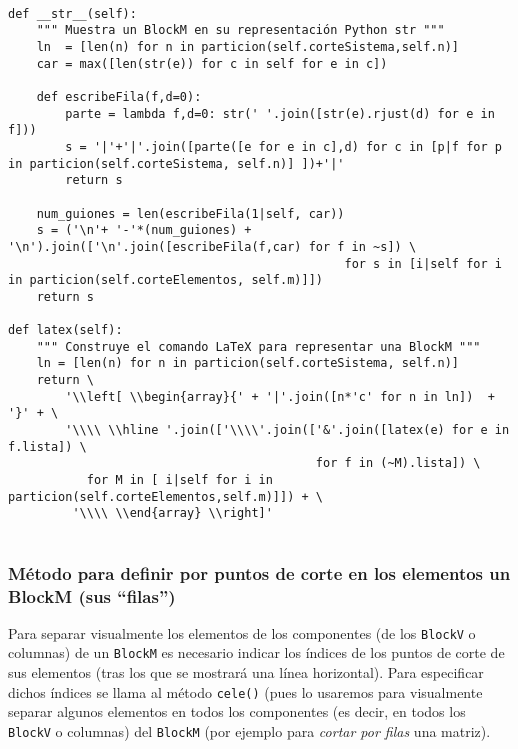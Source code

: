 \documentclass[11pt]{report}
\begin{document}
\begin{verbatim}

def __str__(self):
    """ Muestra un BlockM en su representación Python str """
    ln  = [len(n) for n in particion(self.corteSistema,self.n)]
    car = max([len(str(e)) for c in self for e in c])

    def escribeFila(f,d=0):
        parte = lambda f,d=0: str(' '.join([str(e).rjust(d) for e in f])) 
        s = '|'+'|'.join([parte([e for e in c],d) for c in [p|f for p in particion(self.corteSistema, self.n)] ])+'|'
        return s
    
    num_guiones = len(escribeFila(1|self, car))
    s = ('\n'+ '-'*(num_guiones) + '\n').join(['\n'.join([escribeFila(f,car) for f in ~s]) \
                                               for s in [i|self for i in particion(self.corteElementos, self.m)]])
    return s

def latex(self):
    """ Construye el comando LaTeX para representar una BlockM """
    ln = [len(n) for n in particion(self.corteSistema, self.n)]                                                           
    return \
        '\\left[ \\begin{array}{' + '|'.join([n*'c' for n in ln])  + '}' + \
        '\\\\ \\hline '.join(['\\\\'.join(['&'.join([latex(e) for e in f.lista]) \
                                           for f in (~M).lista]) \
           for M in [ i|self for i in particion(self.corteElementos,self.m)]]) + \
         '\\\\ \\end{array} \\right]'
        
\end{verbatim}

\subsubsection{Método para definir por puntos de corte en los elementos un BlockM (sus ``filas'')}
\label{sec:org74d05fc}

Para separar visualmente los elementos de los componentes (de los
\texttt{BlockV} o columnas) de un \texttt{BlockM} es necesario indicar los índices
de los puntos de corte de sus elementos (tras los que se mostrará una
línea horizontal). Para especificar dichos índices se llama al método
\texttt{cele()} (pues lo usaremos para visualmente separar algunos elementos
en todos los componentes (es decir, en todos los \texttt{BlockV} o columnas)
del \texttt{BlockM} (por ejemplo para \emph{cortar por filas} una matriz).
\end{document}
